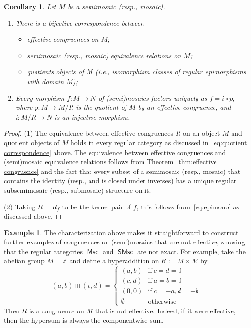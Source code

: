 \documentclass[reqno]{amsart}
\newcommand{\cat}[1]{\ensuremath{\mathsf{#1}}}
\DeclareMathOperator{\Msc}{\cat{Msc}}
\DeclareMathOperator{\SMsc}{\cat{SMsc}}
\numberwithin{equation}{section}
\theoremstyle{plain}
\newtheorem{corollary}[equation]{Corollary}
\theoremstyle{definition}
\newtheorem{example}[equation]{Example}
\begin{document}
\begin{corollary}\label{cor:mosaic quotients}
Let $M$ be a semimosaic (resp., mosaic). 
\begin{enumerate}
\item There is a bijective correspondence between
	\begin{itemize}
    \item effective congruences on $M$;
    \item semimosaic (resp., mosaic) equivalence relations on $M$;
	\item quotients objects of $M$ (i.e., isomorphism classes of regular epimorphisms with domain $M$);
	\end{itemize}
\item Every morphism $f \colon M \to N$ of (semi)mosaics factors uniquely as $f = i \circ p$, where $p \colon M \to M/R$ is the quotient of $M$ by an effective congruence, and $i \colon M/R \to N$ is an injective morphism.
\end{enumerate}
\end{corollary}

\begin{proof}
(1) The equivalence between effective congruences $R$ on an object $M$ and quotient objects of $M$ holds in every regular category as discussed in~\eqref{eq:quotient correspondence} above.
The equivalence between effective congruences and (semi)mosaic equivalence relations follows from Theorem~\ref{thm:effective congruence} and the fact that every subset of a semimosaic (resp., mosaic) that contains the identity (resp., and is closed under inverses) has a unique regular subsemimosaic (resp., submosaic) structure on it.

(2) Taking $R = R_f$ to be the kernel pair of $f$, this follows from~\eqref{eq:epimono} as discussed above.
\end{proof}


 

\begin{example}\label{ex:not exact}
The characterization above makes it straightforward to construct further examples of congruences on (semi)mosaics that are not effective, showing that the regular categories $\Msc$ and $\SMsc$ are not exact. 
For example, take the abelian group $M=\mathbb{Z}$ and define a hyperaddition on $R:=M\times M$ by
$$(a, b)\boxplus(c, d)=\left\{\begin{array}{llll}
(a, b) & \text{if}\ c=d=0\\
(c, d) & \text{if}\ a=b=0\\
(0, 0) & \text{if}\ c=-a, d=-b\\
\emptyset & \text{otherwise}
\end{array}\right.$$ 
Then $R$ is a congruence on $M$ that is not effective. Indeed, if it were effective, then the hypersum is always the componentwise sum.
\end{example}
\end{document}
